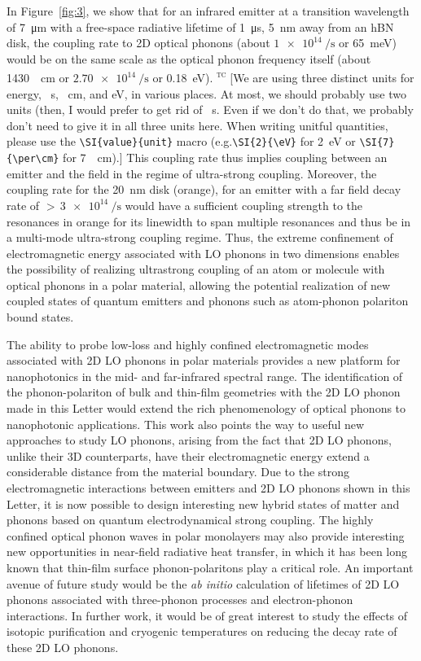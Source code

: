 \documentclass[aps,prb,twocolumn,
	           groupedaddress,superscriptaddress,
               amsfonts,amssymb,amsmath,floatfix,
	           citeautoscript]{revtex4-1}
\makeatletter
\newcommand{\eg}{e.g.\@\xspace}
\newcommand{\comment}[2]{%
    \ifbool{togglecomments}%
    {\textcolor{blue!70!black}{\small\textsf{%
    \textsuperscript{\textsc{\textsf{\MakeLowercase{#1}}}}%
    [#2]}}} %
    {}}     %
\makeatother
\begin{document}
In Figure~\ref{fig:3}, we show that for an infrared emitter at a transition wavelength of \SI{7}{\micro\m} with a free-space radiative lifetime of \SI{1}{\micro\s}, \SI{5}{\nm} away from an hBN disk, the coupling rate to 2D optical phonons (about $\SI{1e14}{\per\s}$ or \SI{65}{\meV}) would be on the same scale as the optical phonon frequency itself (about \SI{1430}{\per\cm} or $\SI{2.70e14}{\per\s}$ or \SI{0.18}{\eV}). 
\comment{tc}{We are using three distinct units for energy, \si{\per\s}, \si{\per\cm}, and \si{\eV}, in various places. At most, we should probably use two units (then, I would prefer to get rid of \si{\per\s}. Even if we don't do that, we probably don't need to give it in all three units here. When writing unitful quantities, please use the \texttt{\textbackslash{}SI\{value\}\{unit\}} macro (\eg \texttt{\textbackslash{}SI\{2\}\{\textbackslash{}eV\}} for \SI{2}{\eV} or \texttt{\textbackslash{}SI\{7\}\{\textbackslash{}per\textbackslash{}cm\}} for \SI{7}{\per\cm}).}
This coupling rate thus implies coupling between an emitter and the field in the regime of ultra-strong coupling. Moreover, the coupling rate for the \SI{20}{\nm} disk (orange), for an emitter with a far field decay rate of ${>}\,\SI{3e14}{\per\s}$ would have a sufficient coupling strength to the resonances in orange for its linewidth to span multiple resonances and thus be in a multi-mode ultra-strong coupling regime. Thus, the extreme confinement of electromagnetic energy associated with LO phonons in two dimensions enables the possibility of realizing ultrastrong coupling of an atom or molecule with optical phonons in a polar material, allowing the potential realization of new coupled states of quantum emitters and phonons such as atom-phonon polariton bound states.

The ability to probe low-loss and highly confined electromagnetic modes associated with 2D LO phonons in polar materials provides a new platform for nanophotonics in the mid- and far-infrared spectral range. The identification of the phonon-polariton of bulk and thin-film geometries with the 2D LO phonon made in this Letter would extend the rich phenomenology of optical phonons to nanophotonic applications. This work also points the way to useful new approaches to study LO phonons, arising from the fact that 2D LO phonons, unlike their 3D counterparts, have their electromagnetic energy extend a considerable distance from the material boundary. Due to the strong electromagnetic interactions between emitters and 2D LO phonons shown in this Letter, it is now possible to design interesting new hybrid states of matter and phonons based on quantum electrodynamical strong coupling. The highly confined optical phonon waves in polar monolayers may also provide interesting new opportunities in near-field radiative heat transfer, in which it has been long known that thin-film surface phonon-polaritons play a critical role. An important avenue of future study would be the \textit{ab initio} calculation of lifetimes of 2D LO phonons associated with three-phonon processes and electron-phonon interactions. In further work, it would be of great interest to study the effects of isotopic purification and cryogenic temperatures on reducing the decay rate of these 2D LO phonons.
\end{document}
